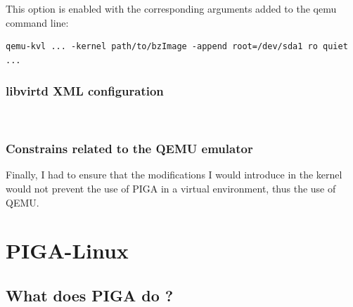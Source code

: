 \documentclass[pdftex,a4paper,titlepage,11pt]{article}
\begin{document}
This option is enabled with the corresponding arguments added to the qemu
command line:

\begin{lstlisting}
qemu-kvl ... -kernel path/to/bzImage -append root=/dev/sda1 ro quiet ...
\end{lstlisting}

\subsubsection{libvirtd XML configuration}

\begin{lstlisting}


\end{lstlisting}

\subsubsection{Constrains related to the QEMU emulator}

Finally, I had to ensure that the modifications I would introduce in the kernel
would not prevent the use of PIGA in a virtual environment, thus the use of
QEMU.



\newpage

\section{PIGA-Linux}

\subsection{What does PIGA do ?}
\end{document}
